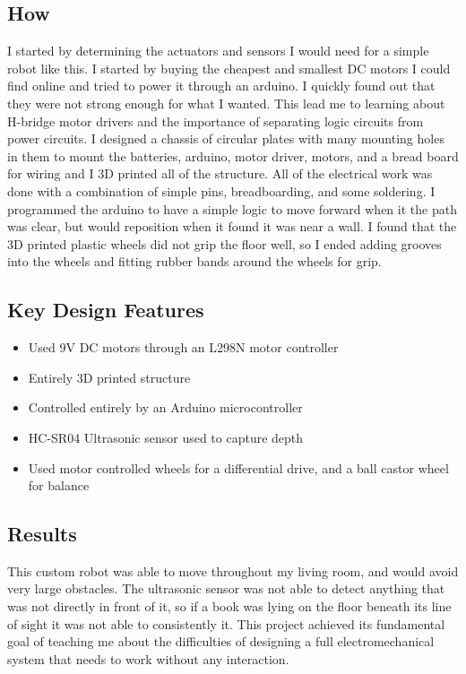\documentclass[11pt]{article}
\begin{document}
\subsection*{How} 
I started by determining the actuators and sensors I would need for a simple robot like this. I started by buying the cheapest and smallest DC motors I could find online and tried to power it through an arduino. I quickly found out that they were not strong enough for what I wanted. This lead me to learning about H-bridge motor drivers and the importance of separating logic circuits from power circuits. I designed a chassis of circular plates with many mounting holes in them to mount the batteries, arduino, motor driver, motors, and a bread board for wiring and I 3D printed all of the structure. All of the electrical work was done with a combination of simple pins, breadboarding, and some soldering. I programmed the arduino to have a simple logic to move forward when it the path was clear, but would reposition when it found it was near a wall. I found that the 3D printed plastic wheels did not grip the floor well, so I ended adding grooves into the wheels and fitting rubber bands around the wheels for grip. 
\subsection*{Key Design Features}
\begin{itemize}
    \item Used 9V DC motors through an L298N motor controller
    \item Entirely 3D printed structure
    \item Controlled entirely by an Arduino microcontroller
    \item HC-SR04 Ultrasonic sensor used to capture depth
    \item Used motor controlled wheels for a differential drive, and a ball castor wheel for balance
\end{itemize}
\subsection*{Results}
This custom robot was able to move throughout my living room, and would avoid very large obstacles. The ultrasonic sensor was not able to detect anything that was not directly in front of it, so if a book was lying on the floor beneath its line of sight it was not able to consistently it. This project achieved its fundamental goal of teaching me about the difficulties of designing a full electromechanical system that needs to work without any interaction.
\end{document}
